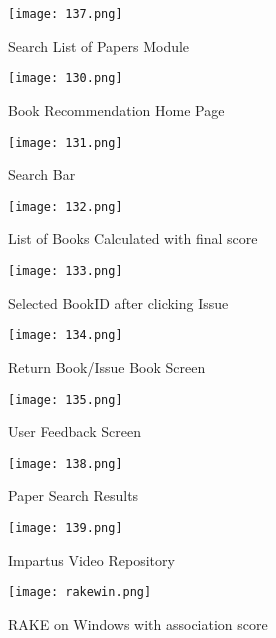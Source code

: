 \documentclass[a4paper,12pt]{report}
\begin{document}
\FloatBarrier
\begin{figure}[h!]
  \centering
  \texttt{[image: 137.png]}
  \caption{Search List of Papers Module}
\end{figure}

\FloatBarrier
\begin{figure}[h!]
  \centering
  \texttt{[image: 130.png]}
  \caption{Book Recommendation Home Page}
\end{figure}

\FloatBarrier
\begin{figure}[h!]
  \centering
  \texttt{[image: 131.png]}
  \caption{Search Bar}
\end{figure}

\FloatBarrier
\begin{figure}[h!]
  \centering
  \texttt{[image: 132.png]}
  \caption{List of Books Calculated with final score}
\end{figure}

\FloatBarrier
\begin{figure}[h!]
  \centering
  \texttt{[image: 133.png]}
  \caption{Selected BookID after clicking Issue}
\end{figure}

\FloatBarrier
\begin{figure}[h!]
  \centering
  \texttt{[image: 134.png]}
  \caption{Return Book/Issue Book Screen}
\end{figure}


\FloatBarrier
\begin{figure}[h!]
  \centering
  \texttt{[image: 135.png]}
  \caption{User Feedback Screen}
\end{figure}

\FloatBarrier
\begin{figure}[h!]
  \centering
  \texttt{[image: 138.png]}
  \caption{Paper Search Results}
\end{figure}

\FloatBarrier
\begin{figure}[h!]
  \centering
  \texttt{[image: 139.png]}
  \caption{Impartus Video Repository}
\end{figure}

\FloatBarrier
\begin{figure}[h!]
  \centering
  \texttt{[image: rakewin.png]}
  \caption{RAKE on Windows with association score}
\end{figure}
\end{document}
